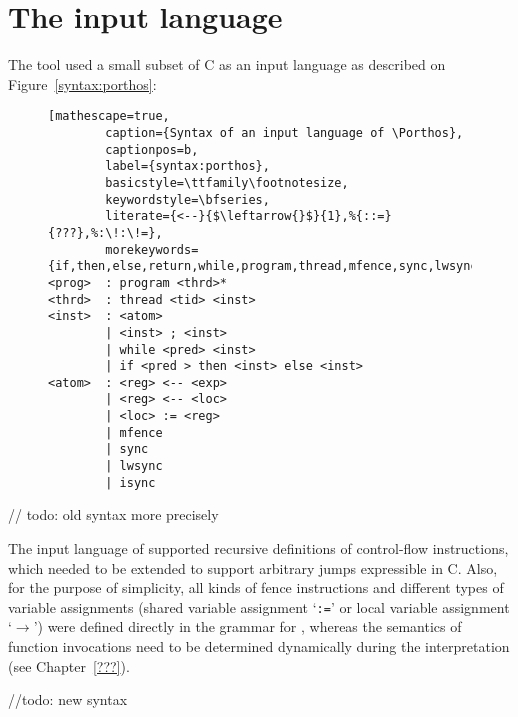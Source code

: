 \chapter{The input language}
\label{ch:impl}

The \Porthos tool used a small subset of C as an input language as described on Figure~\ref{syntax:porthos}\cite{Porthos17}:

\begin{figure}[H]
\begin{lstlisting}[mathescape=true,
        caption={Syntax of an input language of \Porthos},
        captionpos=b,
        label={syntax:porthos},
        basicstyle=\ttfamily\footnotesize,
        keywordstyle=\bfseries,
        literate={<--}{$\leftarrow{}$}{1},%{::=}{???},%:\!:\!=},
        morekeywords={if,then,else,return,while,program,thread,mfence,sync,lwsync,isync}]
<prog>  : program <thrd>*
<thrd>  : thread <tid> <inst>
<inst>  : <atom> 
        | <inst> ; <inst>
        | while <pred> <inst>
        | if <pred > then <inst> else <inst>
<atom>  : <reg> <-- <exp> 
        | <reg> <-- <loc>
        | <loc> := <reg> 
        | mfence
        | sync
        | lwsync
        | isync
\end{lstlisting}
\end{figure}

// todo: old syntax more precisely

The input language of \Porthos supported recursive definitions of control-flow instructions, which needed to be extended to support arbitrary jumps expressible in C. Also, for the purpose of simplicity, all kinds of fence instructions and different types of variable assignments (shared variable assignment `\texttt{:=}' or local variable assignment `$\mathtt{\rightarrow}$') were defined directly in the grammar for \Porthos, whereas the semantics of function invocations need to be determined dynamically during the interpretation
(see Chapter~\ref{???}).

//todo: new syntax